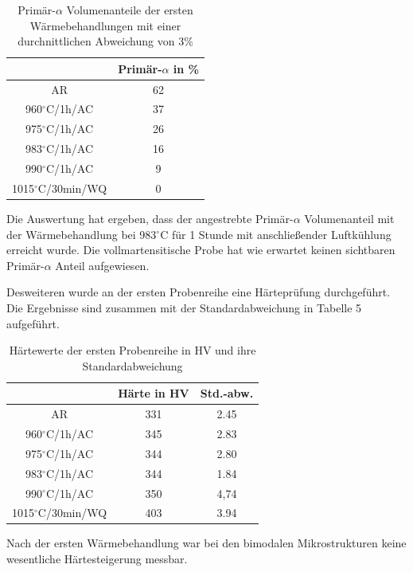 \begin{table}[h]
	\centering
	\begin{tabular}{|c|c|}
		\hline 
		& Primär-$\alpha$ in \% \\ 
		\hline 
		AR & 62 \\ 
		\hline 
		960$^\circ$C/1h/AC & 37 \\ 
		\hline 
		975$^\circ$C/1h/AC & 26 \\ 
		\hline 
		983$^\circ$C/1h/AC & 16 \\ 
		\hline 
		990$^\circ$C/1h/AC & 9 \\ 
		\hline 
		1015$^\circ$C/30min/WQ & 0 \\ 
		\hline 
	\end{tabular} 
	\caption{Primär-$\alpha$ Volumenanteile der ersten Wärmebehandlungen mit einer durchnittlichen Abweichung von 3\%}
	\label{Tabelle 4}
\end{table}

Die Auswertung hat ergeben, dass der angestrebte Primär-$\alpha$ Volumenanteil mit der Wärmebehandlung bei 983$^\circ$C für 1 Stunde mit anschließender Luftkühlung erreicht wurde. Die vollmartensitische Probe hat wie erwartet keinen sichtbaren Primär-$\alpha$ Anteil aufgewiesen.


Desweiteren wurde an der ersten Probenreihe eine Härteprüfung durchgeführt. Die Ergebnisse sind zusammen mit der Standardabweichung in Tabelle 5 aufgeführt. 


\begin{table}[h]
	\centering
	\begin{tabular}{|c|c|c|}
		\hline 
		& Härte in HV &  Std.-abw. \\ 
		\hline 
		AR & 331 & 2.45 \\ 
		\hline 
		960$^\circ$C/1h/AC & 345 & 2.83 \\ 
		\hline 
		975$^\circ$C/1h/AC & 344 & 2.80 \\ 
		\hline 
		983$^\circ$C/1h/AC & 344 & 1.84 \\ 
		\hline 
		990$^\circ$C/1h/AC & 350 & 4,74 \\ 
		\hline 
		1015$^\circ$C/30min/WQ & 403 & 3.94 \\ 
		\hline 
	\end{tabular} 
    \caption{Härtewerte der ersten Probenreihe in HV und ihre Standardabweichung}
    \label{Tabelle 5}
\end{table}

Nach der ersten Wärmebehandlung war bei den bimodalen Mikrostrukturen keine wesentliche Härtesteigerung messbar.

